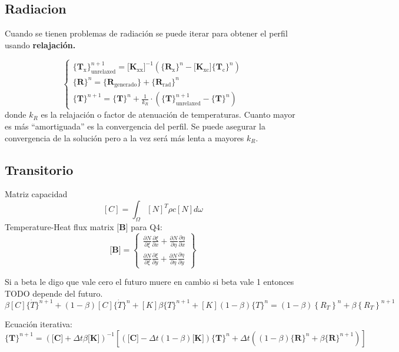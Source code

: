 \documentclass[11pt, a4paper,titlepage]{article}
\newcommand{\Mme}[1]{\boldsymbol{[}\mathbf{#1} \boldsymbol{]}}
\newcommand{\Cme}[1]{\boldsymbol{\{ }\mathbf{#1} \boldsymbol{\}} }
\newcommand{\MB}{\Mme{B}}
\newcommand{\MK}{\Mme{K}}
\newcommand{\MC}{\Mme{C}}
\newcommand{\CTx}{\Cme{T_{\mathrm{x}}}}
\newcommand{\CTc}{\Cme{T_{\mathrm{c}}}}
\newcommand{\CRx}{\Cme{R_{\mathrm{x}}}}
\newcommand{\CR}{\Cme{R}}
\newcommand{\MKxx}{\Mme{K_{\mathrm{xx}}}}
\newcommand{\MKxc}{\Mme{K_{\mathrm{xc}}}}
\begin{document}
\subsection*{Radiacion}
Cuando se tienen problemas de radiación se puede iterar para obtener el perfil usando \textbf{relajación.}


\begin{equation}
\begin{cases}
\CTx^{n+1}_{\mathrm{unrelaxed}} =  \MKxx^{-1}  \left(\CRx^{n} - \MKxc \CTc^{n}\right)\\
\CR^{n} = \Cme{R_{\mathrm{generado}}}+ \Cme{R_{\mathrm{rad}}}^{n} \\
\Cme{T}^{n+1} = \Cme{T}^n + \frac{1}{k_R} \cdot \left( \Cme{T}^{n+1}_{\mathrm{unrelaxed}} - \Cme{T}^{n} \right)
\end{cases}
\end{equation}
donde $k_R$ es la relajación o factor de atenuación de temperaturas. Cuanto mayor es más ``amortiguada'' es la convergencia del perfil. Se puede asegurar la convergencia de la solución pero a la vez será más lenta a mayores $k_R$.


\subsection*{Transitorio}
Matriz capacidad
\[
[C]=\int_{\Omega}[N]^{T} \rho c[N] d \omega
\]
Temperature-Heat flux matrix $\MB$ para Q4:
\[
\MB =
\begin{Bmatrix}
\frac{\partial N}{\partial \xi} \frac{\partial \xi}{\partial x} + \frac{\partial N}{\partial \eta} \frac{\partial \eta}{\partial x} \\
\frac{\partial N}{\partial \xi} \frac{\partial \xi}{\partial y} + \frac{\partial N}{\partial \eta} \frac{\partial \eta}{\partial y} 
\end{Bmatrix}
\]

Si a beta le digo que vale cero el futuro muere en cambio si beta vale 1 entonces TODO depende del futuro.
\[
\beta[C]\{\dot{T}\}^{n+1}+(1-\beta)[C]\{\dot{T}\}^{n}+[K] \beta\{T\}^{n+1}+[K](1-\beta)\{T\}^{n}=(1-\beta)\left\{R_{T}\right\}^{n}+\beta\left\{R_{T}\right\}^{n+1}
\]

Ecuación iterativa:
\begin{equation}
\Cme{T}^{n+1} = \left( \MC +\Delta t \beta \MK \right)^{-1} \left[ \left(\MC -\Delta t(1-\beta) \MK\right) \Cme{T}^n +\Delta t \left( (1-\beta) \Cme{R}^n + \beta \Cme{R}^{n+1}  \right)\right]
\end{equation}
\end{document}
